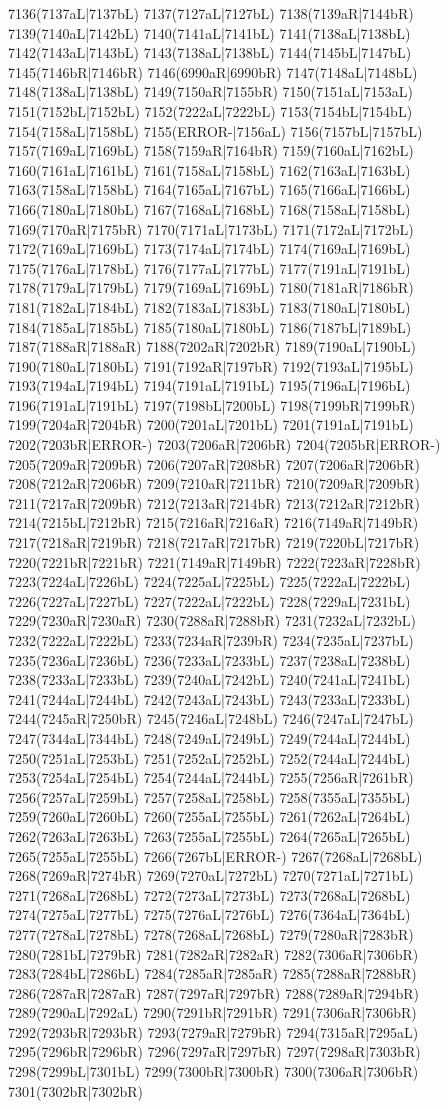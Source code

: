 7136(7137aL|7137bL) 7137(7127aL|7127bL) 7138(7139aR|7144bR) 7139(7140aL|7142bL) 7140(7141aL|7141bL) 7141(7138aL|7138bL) 7142(7143aL|7143bL) 7143(7138aL|7138bL) 7144(7145bL|7147bL) 7145(7146bR|7146bR) 7146(6990aR|6990bR) 7147(7148aL|7148bL) 7148(7138aL|7138bL) 7149(7150aR|7155bR) 7150(7151aL|7153aL) 7151(7152bL|7152bL) 7152(7222aL|7222bL) 7153(7154bL|7154bL) 7154(7158aL|7158bL) 7155(ERROR-|7156aL) 7156(7157bL|7157bL) 7157(7169aL|7169bL) 7158(7159aR|7164bR) 7159(7160aL|7162bL) 7160(7161aL|7161bL) 7161(7158aL|7158bL) 7162(7163aL|7163bL) 7163(7158aL|7158bL) 7164(7165aL|7167bL) 7165(7166aL|7166bL) 7166(7180aL|7180bL) 7167(7168aL|7168bL) 7168(7158aL|7158bL) 7169(7170aR|7175bR) 7170(7171aL|7173bL) 7171(7172aL|7172bL) 7172(7169aL|7169bL) 7173(7174aL|7174bL) 7174(7169aL|7169bL) 7175(7176aL|7178bL) 7176(7177aL|7177bL) 7177(7191aL|7191bL) 7178(7179aL|7179bL) 7179(7169aL|7169bL) 7180(7181aR|7186bR) 7181(7182aL|7184bL) 7182(7183aL|7183bL) 7183(7180aL|7180bL) 7184(7185aL|7185bL) 7185(7180aL|7180bL) 7186(7187bL|7189bL) 7187(7188aR|7188aR) 7188(7202aR|7202bR) 7189(7190aL|7190bL) 7190(7180aL|7180bL) 7191(7192aR|7197bR) 7192(7193aL|7195bL) 7193(7194aL|7194bL) 7194(7191aL|7191bL) 7195(7196aL|7196bL) 7196(7191aL|7191bL) 7197(7198bL|7200bL) 7198(7199bR|7199bR) 7199(7204aR|7204bR) 7200(7201aL|7201bL) 7201(7191aL|7191bL) 7202(7203bR|ERROR-) 7203(7206aR|7206bR) 7204(7205bR|ERROR-) 7205(7209aR|7209bR) 7206(7207aR|7208bR) 7207(7206aR|7206bR) 7208(7212aR|7206bR) 7209(7210aR|7211bR) 7210(7209aR|7209bR) 7211(7217aR|7209bR) 7212(7213aR|7214bR) 7213(7212aR|7212bR) 7214(7215bL|7212bR) 7215(7216aR|7216aR) 7216(7149aR|7149bR) 7217(7218aR|7219bR) 7218(7217aR|7217bR) 7219(7220bL|7217bR) 7220(7221bR|7221bR) 7221(7149aR|7149bR) 7222(7223aR|7228bR) 7223(7224aL|7226bL) 7224(7225aL|7225bL) 7225(7222aL|7222bL) 7226(7227aL|7227bL) 7227(7222aL|7222bL) 7228(7229aL|7231bL) 7229(7230aR|7230aR) 7230(7288aR|7288bR) 7231(7232aL|7232bL) 7232(7222aL|7222bL) 7233(7234aR|7239bR) 7234(7235aL|7237bL) 7235(7236aL|7236bL) 7236(7233aL|7233bL) 7237(7238aL|7238bL) 7238(7233aL|7233bL) 7239(7240aL|7242bL) 7240(7241aL|7241bL) 7241(7244aL|7244bL) 7242(7243aL|7243bL) 7243(7233aL|7233bL) 7244(7245aR|7250bR) 7245(7246aL|7248bL) 7246(7247aL|7247bL) 7247(7344aL|7344bL) 7248(7249aL|7249bL) 7249(7244aL|7244bL) 7250(7251aL|7253bL) 7251(7252aL|7252bL) 7252(7244aL|7244bL) 7253(7254aL|7254bL) 7254(7244aL|7244bL) 7255(7256aR|7261bR) 7256(7257aL|7259bL) 7257(7258aL|7258bL) 7258(7355aL|7355bL) 7259(7260aL|7260bL) 7260(7255aL|7255bL) 7261(7262aL|7264bL) 7262(7263aL|7263bL) 7263(7255aL|7255bL) 7264(7265aL|7265bL) 7265(7255aL|7255bL) 7266(7267bL|ERROR-) 7267(7268aL|7268bL) 7268(7269aR|7274bR) 7269(7270aL|7272bL) 7270(7271aL|7271bL) 7271(7268aL|7268bL) 7272(7273aL|7273bL) 7273(7268aL|7268bL) 7274(7275aL|7277bL) 7275(7276aL|7276bL) 7276(7364aL|7364bL) 7277(7278aL|7278bL) 7278(7268aL|7268bL) 7279(7280aR|7283bR) 7280(7281bL|7279bR) 7281(7282aR|7282aR) 7282(7306aR|7306bR) 7283(7284bL|7286bL) 7284(7285aR|7285aR) 7285(7288aR|7288bR) 7286(7287aR|7287aR) 7287(7297aR|7297bR) 7288(7289aR|7294bR) 7289(7290aL|7292aL) 7290(7291bR|7291bR) 7291(7306aR|7306bR) 7292(7293bR|7293bR) 7293(7279aR|7279bR) 7294(7315aR|7295aL) 7295(7296bR|7296bR) 7296(7297aR|7297bR) 7297(7298aR|7303bR) 7298(7299bL|7301bL) 7299(7300bR|7300bR) 7300(7306aR|7306bR) 7301(7302bR|7302bR) 